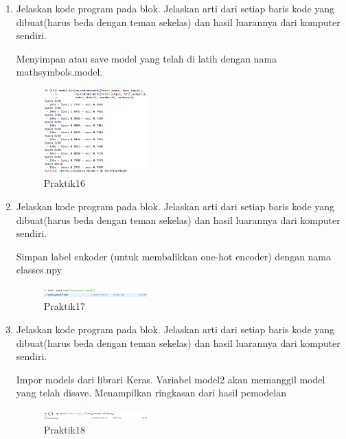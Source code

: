 \begin{enumerate}
\item Jelaskan kode program pada blok. Jelaskan arti dari setiap baris kode yang dibuat(harus beda dengan teman sekelas) dan hasil luarannya dari komputer sendiri.

Menyimpan atau save model yang telah di latih dengan nama mathsymbols.model.



	\begin{figure}[H]
		\includegraphics[width=4cm]{figures/1174008/7/praktik16.PNG}
            	\centering
           	 \caption{Praktik16}
       	 \end{figure}

\item Jelaskan kode program pada blok. Jelaskan arti dari setiap baris kode yang dibuat(harus beda dengan teman sekelas) dan hasil luarannya dari komputer sendiri.

Simpan label enkoder (untuk membalikkan one-hot encoder) dengan nama classes.npy



	\begin{figure}[H]
		\includegraphics[width=4cm]{figures/1174008/7/praktik17.PNG}
            	\centering
           	 \caption{Praktik17}
       	 \end{figure}

\item Jelaskan kode program pada blok. Jelaskan arti dari setiap baris kode yang dibuat(harus beda dengan teman sekelas) dan hasil luarannya dari komputer sendiri.

Impor models dari librari Keras. Variabel model2 akan memanggil model yang telah disave.  Menampilkan ringkasan dari hasil pemodelan



	\begin{figure}[H]
		\includegraphics[width=4cm]{figures/1174008/7/praktik18.PNG}
            	\centering
           	 \caption{Praktik18}
       	 \end{figure}


\end{enumerate}
